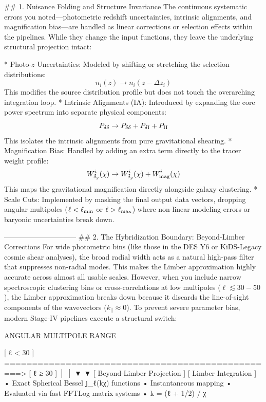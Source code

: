 ## 1. Nuisance Folding and Structure Invariance
The continuous systematic errors you noted—photometric redshift uncertainties, intrinsic alignments, and magnification bias—are handled as linear corrections or selection effects within the pipelines. While they change the input functions, they leave the underlying structural projection intact:

* Photo-$z$ Uncertainties: Modeled by shifting or stretching the selection distributions:
$$n_i(z) \to n_i(z - \Delta z_i)$$ 
This modifies the source distribution profile but does not touch the overarching integration loop.
* Intrinsic Alignments (IA): Introduced by expanding the core power spectrum into separate physical components:
$$P_{\delta\delta} \to P_{\delta\delta} + P_{\delta {\rm I}} + P_{\rm II}$$ 
This isolates the intrinsic alignments from pure gravitational shearing.
* Magnification Bias: Handled by adding an extra term directly to the tracer weight profile:
$$W_{\delta_g}^i(\chi) \to W_{\delta_g}^i(\chi) + W_{\rm mag}^i(\chi)$$ 
This maps the gravitational magnification directly alongside galaxy clustering.
* Scale Cuts: Implemented by masking the final output data vectors, dropping angular multipoles ($\ell < \ell_{\rm min}$ or $\ell > \ell_{\rm max}$) where non-linear modeling errors or baryonic uncertainties break down.

------------------------------
## 2. The Hybridization Boundary: Beyond-Limber Corrections
For wide photometric bins (like those in the DES Y6 or KiDS-Legacy cosmic shear analyses), the broad radial width acts as a natural high-pass filter that suppresses non-radial modes. This makes the Limber approximation highly accurate across almost all usable scales.
However, when you include narrow spectroscopic clustering bins or cross-correlations at low multipoles ($\ell \lesssim 30 - 50$), the Limber approximation breaks down because it discards the line-of-sight components of the wavevectors ($k_\parallel \approx 0$). To prevent severe parameter bias, modern Stage-IV pipelines execute a structural switch:

                              ANGULAR MULTIPOLE RANGE
  
  [ ℓ < 30 ]  =================================================> [ ℓ ≥ 30 ]
       │                                                             │
       ▼                                                             ▼
  [ Beyond-Limber Projection ]                                  [ Limber Integration ]
  • Exact Spherical Bessel j_ℓ(kχ) functions                     • Instantaneous mapping
  • Evaluated via fast FFTLog matrix systems                     • k = (ℓ + 1/2) / χ

